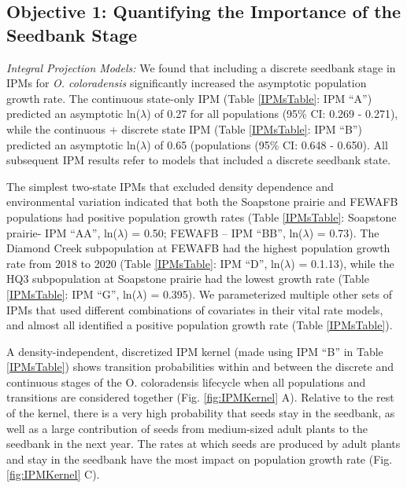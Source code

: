\documentclass[12pt, letterpaper]{article}
\begin{document}
\subsection{Objective 1: Quantifying the Importance of the Seedbank Stage}

\textit{Integral Projection Models:} We found that including a discrete seedbank stage in IPMs for \textit{O. coloradensis} significantly increased the asymptotic population growth rate. The continuous state-only IPM (Table \ref{IPMsTable}: IPM “A”) predicted an asymptotic ln($\lambda$) of 0.27 for all populations (95\% CI: 0.269 - 0.271), while the continuous + discrete state IPM (Table \ref{IPMsTable}: IPM “B”) predicted an asymptotic ln($\lambda$) of 0.65 (populations (95\% CI: 0.648 - 0.650). All subsequent IPM results refer to models that included a discrete seedbank state. 

The simplest two-state IPMs that excluded density dependence and environmental variation indicated that both the Soapstone prairie and FEWAFB populations had positive population growth rates (Table \ref{IPMsTable}: Soapstone prairie- IPM “AA”, ln($\lambda$) = 0.50;  FEWAFB – IPM “BB”, ln($\lambda$) =  0.73). The Diamond Creek subpopulation at FEWAFB had the highest population growth rate from 2018 to 2020 (Table \ref{IPMsTable}: IPM “D”, ln($\lambda$) = 0.1.13), while the HQ3 subpopulation at Soapstone prairie had the lowest growth rate (Table \ref{IPMsTable}: IPM “G”, ln($\lambda$) = 0.395). We parameterized multiple other sets of IPMs that used different combinations of covariates in their vital rate models, and almost all identified a positive population growth rate (Table \ref{IPMsTable}).   

A density-independent, discretized IPM kernel (made using IPM “B” in Table \ref{IPMsTable}) shows transition probabilities within and between the discrete and continuous stages of the O. coloradensis lifecycle when all populations and transitions are considered together (Fig. \ref{fig:IPMKernel} A). Relative to the rest of the kernel, there is a very high probability that seeds stay in the seedbank, as well as a large contribution of seeds from medium-sized adult plants to the seedbank in the next year. The rates at which seeds are produced by adult plants and stay in the seedbank have the most impact on population growth rate (Fig. \ref{fig:IPMKernel} C).
\end{document}

